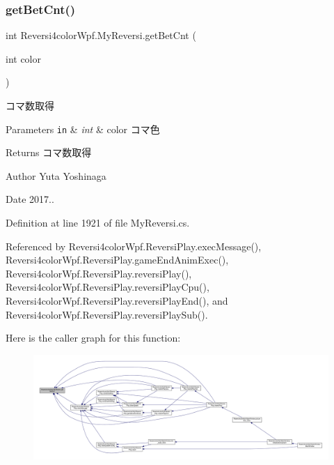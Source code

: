 \subsubsection{\texorpdfstring{get\+Bet\+Cnt()}{getBetCnt()}}
{\footnotesize\ttfamily int Reversi4color\+Wpf.\+My\+Reversi.\+get\+Bet\+Cnt (\begin{DoxyParamCaption}\item[{int}]{color }\end{DoxyParamCaption})}



コマ数取得 


\begin{DoxyParams}[1]{Parameters}
\mbox{\tt in}  & {\em int} & color コマ色 \\
\hline
\end{DoxyParams}
\begin{DoxyReturn}{Returns}
コマ数取得 
\end{DoxyReturn}
\begin{DoxyAuthor}{Author}
Yuta Yoshinaga 
\end{DoxyAuthor}
\begin{DoxyDate}{Date}
2017.. 
\end{DoxyDate}


Definition at line 1921 of file My\+Reversi.\+cs.



Referenced by Reversi4color\+Wpf.\+Reversi\+Play.\+exec\+Message(), Reversi4color\+Wpf.\+Reversi\+Play.\+game\+End\+Anim\+Exec(), Reversi4color\+Wpf.\+Reversi\+Play.\+reversi\+Play(), Reversi4color\+Wpf.\+Reversi\+Play.\+reversi\+Play\+Cpu(), Reversi4color\+Wpf.\+Reversi\+Play.\+reversi\+Play\+End(), and Reversi4color\+Wpf.\+Reversi\+Play.\+reversi\+Play\+Sub().

Here is the caller graph for this function\+:
\nopagebreak
\begin{figure}[H]
\begin{center}
\leavevmode
\includegraphics[width=350pt]{class_reversi4color_wpf_1_1_my_reversi_aeb3aac2b535091f0c31b69c35e3bee3b_icgraph}
\end{center}
\end{figure}
\mbox{\label{class_reversi4color_wpf_1_1_my_reversi_aea110063f001e3ec863350e681b365c9}} 
